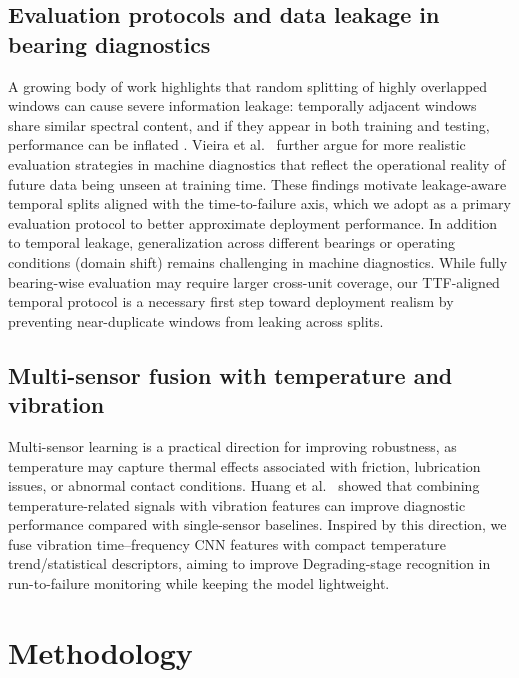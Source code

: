 \documentclass{article}
\begin{document}
\subsection{Evaluation protocols and data leakage in bearing diagnostics}
A growing body of work highlights that random splitting of highly overlapped windows can cause severe information leakage: temporally adjacent windows share similar spectral content, and if they appear in both training and testing, performance can be inflated \cite{wheat2024leakage}. Vieira et al.~\cite{vieira2024realistic} further argue for more realistic evaluation strategies in machine diagnostics that reflect the operational reality of future data being unseen at training time. These findings motivate leakage-aware temporal splits aligned with the time-to-failure axis, which we adopt as a primary evaluation protocol to better approximate deployment performance.
In addition to temporal leakage, generalization across different bearings or operating conditions (domain shift) remains challenging in machine diagnostics. While fully bearing-wise evaluation may require larger cross-unit coverage, our TTF-aligned temporal protocol is a necessary first step toward deployment realism by preventing near-duplicate windows from leaking across splits.
\subsection{Multi-sensor fusion with temperature and vibration}
Multi-sensor learning is a practical direction for improving robustness, as temperature may capture thermal effects associated with friction, lubrication issues, or abnormal contact conditions. Huang et al.~\cite{huang2023esrel_tempvib} showed that combining temperature-related signals with vibration features can improve diagnostic performance compared with single-sensor baselines. Inspired by this direction, we fuse vibration time--frequency CNN features with compact temperature trend/statistical descriptors, aiming to improve Degrading-stage recognition in run-to-failure monitoring while keeping the model lightweight.

\section{Methodology}
\label{sec:method}
\end{document}
